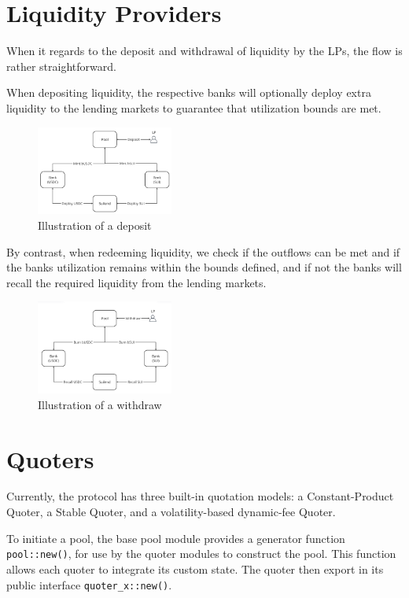 \documentclass[sigconf,nonacm,prologue,table]{acmart}
\numberwithin{equation}{section}
\theoremstyle{definition}
\theoremstyle{remark}
\begin{document}
\section{Liquidity Providers}
\label{sec:lp}
When it regards to the deposit and withdrawal of liquidity by the LPs, the flow is rather straightforward.

When depositing liquidity, the respective banks will optionally deploy extra liquidity to the lending markets to guarantee that utilization bounds are met.

\begin{figure}[htbp]
  \centering
  \includegraphics[width=0.4\textwidth]{assets/depositflow.png}
  \caption{Illustration of a deposit}
  \label{fig:deposit}
\end{figure}

By contrast, when redeeming liquidity, we check if the outflows can be met and if the banks utilization remains within the bounds defined, and if not the banks will recall the required liquidity from the lending markets.

\begin{figure}[htbp]
  \centering
  \includegraphics[width=0.4\textwidth]{assets/withdrawflow.png}
  \caption{Illustration of a withdraw}
  \label{fig:withdraw}
\end{figure}


\section{Quoters}
\label{sec:quoters}

Currently, the protocol has three built-in quotation models: a Constant-Product Quoter, a Stable Quoter, and a volatility-based dynamic-fee Quoter.

To initiate a pool, the base pool module provides a generator function \verb|pool::new()|, for use by the quoter modules to construct the pool. This function allows each quoter to integrate its custom state. The quoter then export in its public interface \verb|quoter_x::new()|.
\end{document}
